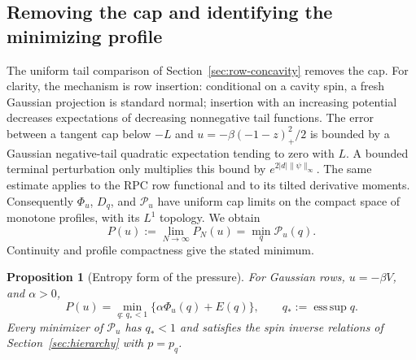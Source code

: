 \documentclass[11pt,a4paper]{article}
\numberwithin{equation}{section}
\newtheorem{proposition}[theorem]{Proposition}
\theoremstyle{definition}
\theoremstyle{remark}
\DeclareMathOperator*{\esssup}{ess\,sup}
\begin{document}
\subsection{Removing the cap and identifying the minimizing profile}

The uniform tail comparison of Section~\ref{sec:row-concavity} removes the
cap. For clarity, the mechanism is row insertion: conditional on a cavity
spin, a fresh Gaussian projection is standard normal; insertion with an
increasing potential decreases expectations of decreasing nonnegative tail
functions. The error between a tangent cap below $-L$ and
$u=-\beta(-1-z)_+^2/2$ is bounded by a Gaussian negative-tail quadratic
expectation tending to zero with $L$. A bounded terminal perturbation only
multiplies this bound by $e^{2|d|\|\psi\|_\infty}$.
The same estimate applies to the RPC row functional and to its tilted
derivative moments. Consequently $\Phi_u$, $D_q$, and $\mathcal P_u$ have
uniform cap limits on the compact space of monotone profiles, with its $L^1$
topology. We obtain
\[
 P(u):=\lim_{N\to\infty}P_N(u)=\min_q\mathcal P_u(q).
\]
Continuity and profile compactness give the stated minimum.

\begin{proposition}[Entropy form of the pressure]\label{prop:press-formula}
For Gaussian rows, $u=-\beta V$, and $\alpha>0$,
\begin{equation}\label{eq:src9}
 P(u)=\min_{q:\,q_*<1}\{\alpha\Phi_u(q)+E(q)\},
 \qquad q_*:=\esssup q.
\end{equation}
Every minimizer of $\mathcal P_u$ has $q_*<1$ and satisfies the spin inverse
relations of Section~\ref{sec:hierarchy} with $p=p_q$.
\end{proposition}
\end{document}
